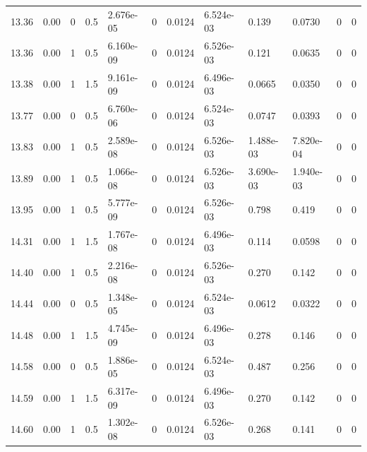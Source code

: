 \documentclass[preview]{standalone}
\begin{document}
{{{\begin{tabular}{L{1.2cm}C{1.2cm} C{0.3cm}C{0.5cm} C{1.4cm}C{1.4cm} C{1.4cm}C{1.4cm} C{1.6cm}C{1.6cm} C{1.6cm}C{1.6cm}}
  13.36  &  0.00  & 0     & 0.5 &  2.676e-05  & 0  &  0.0124&   6.524e-03& 0.139 & 0.0730   &  0 & 0  \\ 
  13.36  &  0.00  & 1     & 0.5 &  6.160e-09  & 0  &  0.0124&   6.526e-03& 0.121 & 0.0635   &  0 & 0  \\ 
  13.38  &  0.00  & 1     & 1.5 &  9.161e-09  & 0  &  0.0124&   6.496e-03& 0.0665 & 0.0350   &  0 & 0  \\ 
  13.77  &  0.00  & 0     & 0.5 &  6.760e-06  & 0  &  0.0124&   6.524e-03& 0.0747 & 0.0393   &  0 & 0  \\ 
  13.83  &  0.00  & 1     & 0.5 &  2.589e-08  & 0  &  0.0124&   6.526e-03& 1.488e-03 & 7.820e-04   &  0 & 0  \\ 
  13.89  &  0.00  & 1     & 0.5 &  1.066e-08  & 0  &  0.0124&   6.526e-03& 3.690e-03 & 1.940e-03   &  0 & 0  \\ 
  13.95  &  0.00  & 1     & 0.5 &  5.777e-09  & 0  &  0.0124&   6.526e-03& 0.798 & 0.419   &  0 & 0  \\ 
  14.31  &  0.00  & 1     & 1.5 &  1.767e-08  & 0  &  0.0124&   6.496e-03& 0.114 & 0.0598   &  0 & 0  \\ 
  14.40  &  0.00  & 1     & 0.5 &  2.216e-08  & 0  &  0.0124&   6.526e-03& 0.270 & 0.142   &  0 & 0  \\ 
  14.44  &  0.00  & 0     & 0.5 &  1.348e-05  & 0  &  0.0124&   6.524e-03& 0.0612 & 0.0322   &  0 & 0  \\ 
  14.48  &  0.00  & 1     & 1.5 &  4.745e-09  & 0  &  0.0124&   6.496e-03& 0.278 & 0.146   &  0 & 0  \\ 
  14.58  &  0.00  & 0     & 0.5 &  1.886e-05  & 0  &  0.0124&   6.524e-03& 0.487 & 0.256   &  0 & 0  \\ 
  14.59  &  0.00  & 1     & 1.5 &  6.317e-09  & 0  &  0.0124&   6.496e-03& 0.270 & 0.142   &  0 & 0  \\ 
  14.60  &  0.00  & 1     & 0.5 &  1.302e-08  & 0  &  0.0124&   6.526e-03& 0.268 & 0.141   &  0 & 0  \\ 
\hline 
\end{tabular} 

}}}
\end{document}
